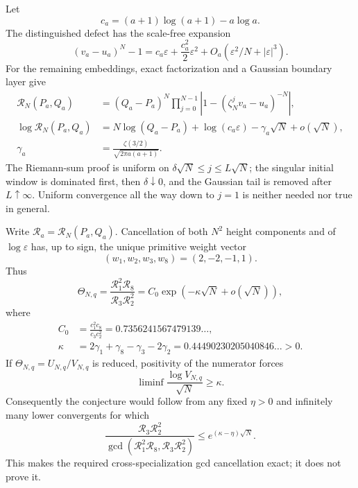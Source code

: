 \documentclass[11pt,oneside]{article}
\theoremstyle{definition}
\theoremstyle{remark}
\begin{document}
Let
\[
 c_a=(a+1)\log(a+1)-a\log a.
\]
The distinguished defect has the scale-free expansion
\begin{equation}
 (v_a-u_a)^N-1
 =c_a\varepsilon+\frac{c_a^2}{2}\varepsilon^2
 +O_a(\varepsilon^2/N+|\varepsilon|^3).
 \label{crit:eq-adjacent-distinguished-jet}
\end{equation}
For the remaining embeddings, exact factorization and a Gaussian boundary layer give
\begin{align}
 \mathcal R_N(P_a,Q_a)
 &=(Q_a-P_a)^N\prod_{j=0}^{N-1}
   |1-(\zeta_N^jv_a-u_a)^{-N}|,\nonumber\\
 \log\mathcal R_N(P_a,Q_a)
 &=N\log(Q_a-P_a)+\log(c_a\varepsilon)
   -\gamma_a\sqrt N+o(\sqrt N),\nonumber\\
 \gamma_a&=\frac{\zeta(3/2)}{\sqrt{2\pi a(a+1)}}.
 \label{crit:eq-adjacent-boundary-law}
\end{align}
The Riemann-sum proof is uniform on
$\delta\sqrt N\le j\le L\sqrt N$; the singular initial window is dominated first, then
$\delta\downarrow0$, and the Gaussian tail is removed after $L\uparrow\infty$.  Uniform
convergence all the way down to $j=1$ is neither needed nor true in general.

Write $\mathcal R_a=\mathcal R_N(P_a,Q_a)$.  Cancellation of both $N^2$ height components
and of $\log\varepsilon$ has, up to sign, the unique primitive weight vector
\[
 (w_1,w_2,w_3,w_8)=(2,-2,-1,1).
\]
Thus
\begin{equation}
 \Theta_{N,q}=\frac{\mathcal R_1^2\mathcal R_8}
 {\mathcal R_3\mathcal R_2^2}
 =C_0\exp(-\kappa\sqrt N+o(\sqrt N)),
 \label{crit:eq-balanced-catalan-quotient}
\end{equation}
where
\begin{align}
 C_0&=\frac{c_1^2c_8}{c_3c_2^2}
 =0.7356241567479139\ldots,\nonumber\\
 \kappa&=2\gamma_1+\gamma_8-\gamma_3-2\gamma_2
 =0.44490230205040846\ldots>0.
 \label{crit:eq-balanced-catalan-constants}
\end{align}
If $\Theta_{N,q}=U_{N,q}/V_{N,q}$ is reduced, positivity of the numerator forces
\begin{equation}
 \liminf\frac{\log V_{N,q}}{\sqrt N}\ge\kappa.
 \label{crit:eq-balanced-denominator}
\end{equation}
Consequently the conjecture would follow from any fixed $\eta>0$ and infinitely many lower
convergents for which
\[
 \frac{\mathcal R_3\mathcal R_2^2}
 {\gcd(\mathcal R_1^2\mathcal R_8,\mathcal R_3\mathcal R_2^2)}
 \le e^{(\kappa-\eta)\sqrt N}.
\]
This makes the required cross-specialization gcd cancellation exact; it does not prove it.
\end{document}
